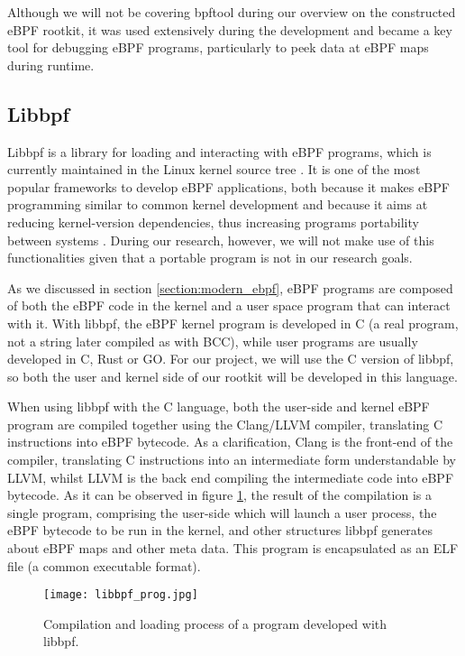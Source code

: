 Although we will not be covering bpftool during our overview on the constructed eBPF rootkit, it was used extensively during the development and became a key tool for debugging eBPF programs, particularly to peek data at eBPF maps during runtime.

\subsection{Libbpf}
Libbpf \cite{libbpf_github} is a library for loading and interacting with eBPF programs, which is currently maintained in the Linux kernel source tree \cite{libbpf_upstream}. It is one of the most popular frameworks to develop eBPF applications, both because it makes eBPF programming similar to common kernel development and because it aims at reducing kernel-version dependencies, thus increasing programs portability between systems \cite{libbpf_core}. During our research, however, we will not make use of this functionalities given that a portable program is not in our research goals.

As we discussed in section \ref{section:modern_ebpf}, eBPF programs are composed of both the eBPF code in the kernel and a user space program that can interact with it. With libbpf, the eBPF kernel program is developed in C (a real program, not a string later compiled as with BCC), while user programs are usually developed in C, Rust or GO. For our project, we will use the C version of libbpf, so both the user and kernel side of our rootkit will be developed in this language.

When using libbpf with the C language, both the user-side and kernel eBPF program are compiled together using the Clang/LLVM compiler, translating C instructions into eBPF bytecode. As a clarification, Clang is the front-end of the compiler, translating C instructions into an intermediate form understandable by LLVM, whilst LLVM is the back end compiling the intermediate code into eBPF bytecode. As it can be observed in figure \ref{fig:libbpf}, the result of the compilation is a single program, comprising the user-side which will launch a user process, the eBPF bytecode to be run in the kernel, and other structures libbpf generates about eBPF maps and other meta data. This program is encapsulated as an ELF file (a common executable format).

\begin{figure}[htbp]
	\centering
	\texttt{[image: libbpf\_prog.jpg]}
	\caption{Compilation and loading process of a program developed with libbpf.}
	\label{fig:libbpf}
\end{figure}

